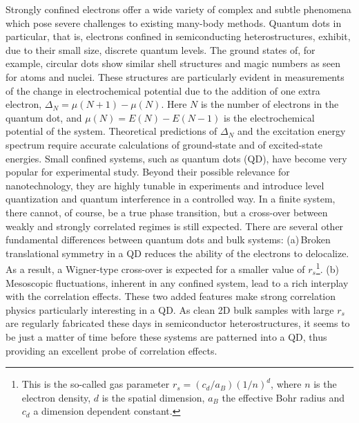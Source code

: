 \documentclass[10pt]{revtex4}
\begin{document}
Strongly confined electrons
offer a wide variety of complex and subtle phenomena which pose severe 
challenges to existing many-body methods.
Quantum dots in particular, that is, electrons confined in semiconducting heterostructures,
exhibit, due to their small size, discrete quantum levels. 
The ground states of, for example, circular dots
show similar shell structures and magic numbers 
as seen for atoms and nuclei. These structures are particularly evident in
measurements of the change in electrochemical potential due to the addition of
one extra electron, 
$\Delta_N=\mu(N+1)-\mu(N)$. Here $N$ is the number of electrons in the quantum dot, and
$\mu(N)=E(N)-E(N-1)$ is the electrochemical potential of the system.
Theoretical predictions of $\Delta_N$ and the excitation energy spectrum require
accurate calculations of ground-state and of excited-state energies.
Small confined systems, such as quantum dots (QD), have become very popular for experimental 
study. Beyond their possible relevance for nanotechnology, they are highly tunable 
in experiments and introduce level quantization and quantum interference in a controlled way. In a finite system, 
there cannot, of course, be a true phase transition, but a cross-over between weakly and strongly correlated regimes is 
still expected. There are several other fundamental differences between quantum dots and bulk systems: (a)\,Broken translational 
symmetry in a QD reduces the ability of the electrons to delocalize. As a result, a Wigner-type cross-over 
is expected for a smaller value of $r_s$\footnote{This is the so-called gas parameter $r_s=(c_d/a_B)(1/n)^d$, where $n$ is the electron density, $d$ is the spatial dimension, $a_B$ the effective Bohr radius and  $c_d$ a dimension dependent constant.}. (b)\,Mesoscopic fluctuations, inherent in any confined system, 
lead to a rich interplay with the correlation effects. These two added features make strong correlation physics particularly 
interesting in a QD. As clean 2D bulk samples with large $r_s$ are regularly fabricated these days in semiconductor 
heterostructures, it seems to be just a matter of time before these systems are patterned into a QD, 
thus providing an excellent probe of correlation effects.
\end{document}
